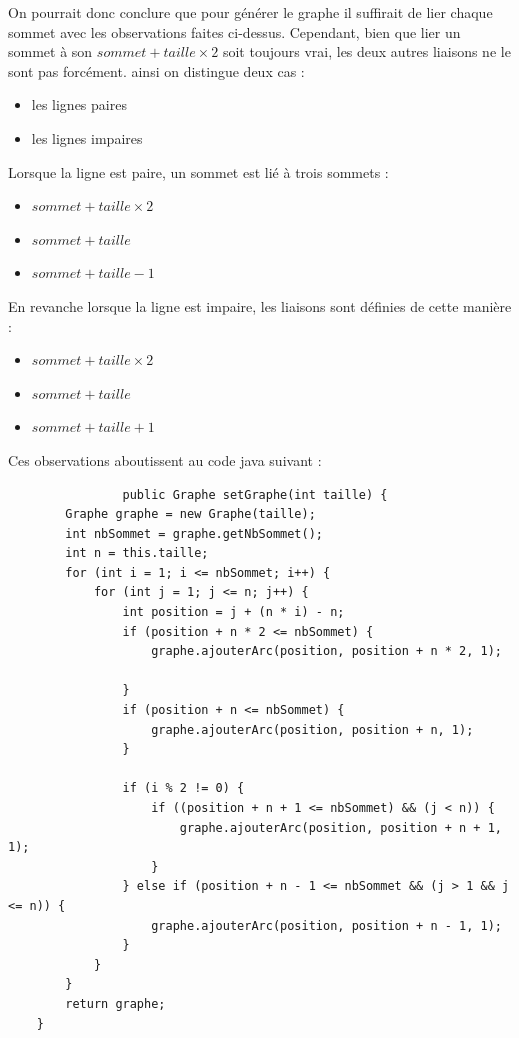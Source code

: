 \documentclass{report}
\begin{document}
			On pourrait donc conclure que pour générer le graphe il suffirait de lier chaque sommet avec les observations faites ci-dessus. Cependant, bien que lier un sommet à son $sommet+taille\times2$ soit toujours vrai, les deux autres liaisons ne le sont pas forcément. ainsi on distingue deux cas :
			
			
			\begin{itemize}
			
			
				\item les lignes paires
				\item les lignes impaires
				\end{itemize}
				
			Lorsque la ligne est paire, un sommet est lié à trois sommets :
				
				\begin{itemize}
					\item $sommet+taille\times2$
					\item $sommet+taille$
					\item $sommet+taille-1$
				\end{itemize}
				
			En revanche lorsque la ligne est impaire, les liaisons sont définies de cette manière : 
				
				\begin{itemize}
					\item $sommet+taille\times2$
					\item $sommet+taille$
					\item $sommet+taille+1$
					\end{itemize}
					
			Ces observations aboutissent au code java suivant : 
			\\
			\begin{verbatim}
				public Graphe setGraphe(int taille) {
        Graphe graphe = new Graphe(taille);
        int nbSommet = graphe.getNbSommet();
        int n = this.taille;
        for (int i = 1; i <= nbSommet; i++) { 
            for (int j = 1; j <= n; j++) { 
                int position = j + (n * i) - n;
                if (position + n * 2 <= nbSommet) { 
                    graphe.ajouterArc(position, position + n * 2, 1);

                }
                if (position + n <= nbSommet) {
                    graphe.ajouterArc(position, position + n, 1);
                }

                if (i % 2 != 0) {    
                    if ((position + n + 1 <= nbSommet) && (j < n)) { 
                        graphe.ajouterArc(position, position + n + 1, 1);
                    }
                } else if (position + n - 1 <= nbSommet && (j > 1 && j <= n)) {
                    graphe.ajouterArc(position, position + n - 1, 1);
                }
            }
        }
        return graphe;
    }
			\end{verbatim}
			
\end{document}
